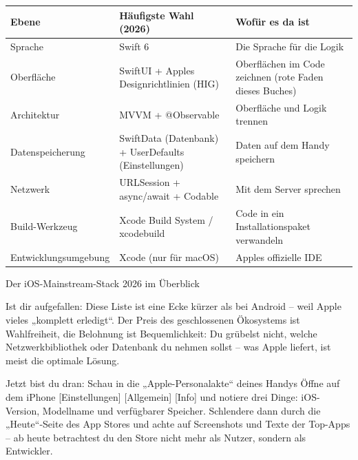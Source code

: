 
\begin{center}
\begin{tabularx}{\linewidth}{|X|X|X|}
\hline
\textbf{Ebene} & \textbf{Häufigste Wahl (2026)} & \textbf{Wofür es da ist} \tabularnewline
\hline
Sprache & Swift 6 & Die Sprache für die Logik \tabularnewline
Oberfläche & SwiftUI + Apples Designrichtlinien (HIG) & Oberflächen im Code zeichnen (rote Faden dieses Buches) \tabularnewline
Architektur & MVVM + @Observable & Oberfläche und Logik trennen \tabularnewline
Datenspeicherung & SwiftData (Datenbank) + UserDefaults (Einstellungen) & Daten auf dem Handy speichern \tabularnewline
Netzwerk & URLSession + async/await + Codable & Mit dem Server sprechen \tabularnewline
Build-Werkzeug & Xcode Build System / xcodebuild & Code in ein Installationspaket verwandeln \tabularnewline
Entwicklungsumgebung & Xcode (nur für macOS) & Apples offizielle IDE \tabularnewline
\hline
\end{tabularx}
\end{center}

\begin{center}\small\color{gray}Der iOS-Mainstream-Stack 2026 im Überblick\end{center}

Ist dir aufgefallen: Diese Liste ist eine Ecke kürzer als bei Android – weil Apple vieles „komplett erledigt“. Der Preis des geschlossenen Ökosystems ist Wahlfreiheit, die Belohnung ist Bequemlichkeit: Du grübelst nicht, welche Netzwerkbibliothek oder Datenbank du nehmen sollst – was Apple liefert, ist meist die optimale Lösung.

\begin{tcbpractice}{Jetzt bist du dran: Schau in die „Apple-Personalakte“ deines Handys}
Öffne auf dem iPhone [Einstellungen] [Allgemein] [Info] und notiere drei Dinge: iOS-Version, Modellname und verfügbarer Speicher. Schlendere dann durch die „Heute“-Seite des App Stores und achte auf Screenshots und Texte der Top-Apps – ab heute betrachtest du den Store nicht mehr als Nutzer, sondern als Entwickler.

\end{tcbpractice}

